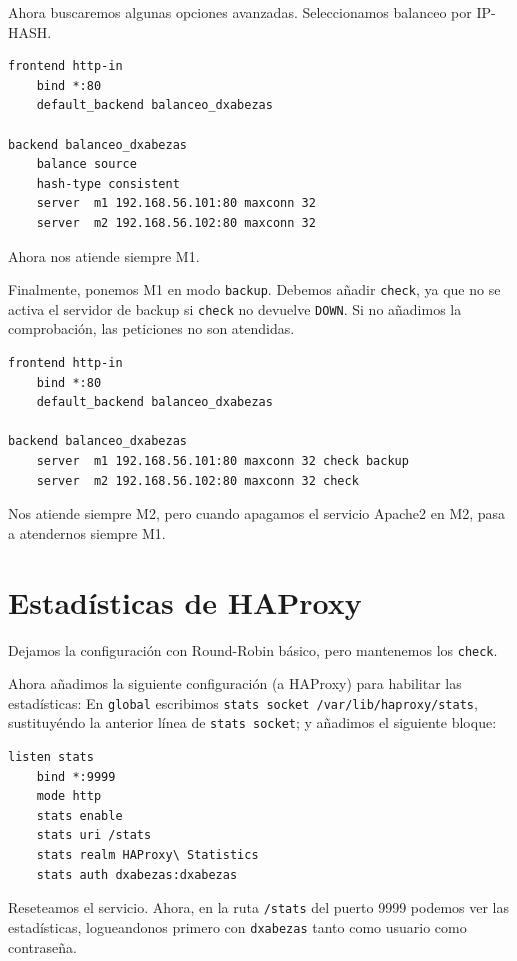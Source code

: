 \documentclass{article}
\begin{document}
Ahora buscaremos algunas opciones avanzadas. Seleccionamos balanceo por IP-HASH. 

\begin{Verbatim}[tabsize=4]
frontend http-in
	bind *:80
	default_backend balanceo_dxabezas

backend balanceo_dxabezas
	balance source
	hash-type consistent
	server  m1 192.168.56.101:80 maxconn 32
	server  m2 192.168.56.102:80 maxconn 32
\end{Verbatim}
Ahora nos atiende siempre M1.
    
Finalmente, ponemos M1 en modo \texttt{backup}. Debemos añadir \texttt{check}, ya que no se activa el servidor de
backup si \texttt{check} no devuelve \texttt{DOWN}. Si no añadimos la comprobación, las peticiones no son atendidas.
\begin{Verbatim}[tabsize=4]
frontend http-in
	bind *:80
	default_backend balanceo_dxabezas

backend balanceo_dxabezas
	server  m1 192.168.56.101:80 maxconn 32 check backup
	server  m2 192.168.56.102:80 maxconn 32 check
\end{Verbatim}
Nos atiende siempre M2, pero cuando apagamos el servicio Apache2 en M2, pasa a atendernos siempre M1.

\section{Estadísticas de HAProxy}

Dejamos la configuración con Round-Robin básico, pero mantenemos los \texttt{check}.

Ahora añadimos la siguiente configuración (a HAProxy) para habilitar las estadísticas: En \texttt{global} escribimos
\verb^stats socket /var/lib/haproxy/stats^, sustituyéndo la anterior línea de \texttt{stats socket}; y añadimos el
siguiente bloque:
\begin{Verbatim}[tabsize=4]
listen stats
	bind *:9999
	mode http
	stats enable
	stats uri /stats
	stats realm HAProxy\ Statistics
	stats auth dxabezas:dxabezas
\end{Verbatim}
Reseteamos el servicio. Ahora, en la ruta \texttt{/stats} del puerto 9999 podemos ver las estadísticas,
logueandonos primero con \texttt{dxabezas} tanto como usuario como contraseña.
\end{document}
